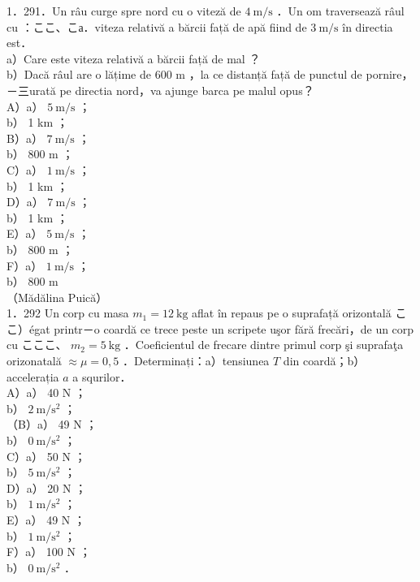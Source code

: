 {1．291．Un râu curge spre nord cu o viteză de $4 \mathrm{~m} / \mathrm{s}$ ．Un om traversează râul cu ：ここ、こа．viteza relativă a bărcii față de apă fiind de $3 \mathrm{~m} / \mathrm{s}$ în directia est．\\
a）Care este viteza relativă a bărcii față de mal ？\\
b）Dacă râul are o lățime de 600 m ，la ce distanță față de punctul de pornire， －三urată pe directia nord，va ajunge barca pe malul opus？\\
A）a） $5 \mathrm{~m} / \mathrm{s}$ ；\\
b） 1 km ；\\
B）a） $7 \mathrm{~m} / \mathrm{s}$ ；\\
b） 800 m ；\\
C）a） $1 \mathrm{~m} / \mathrm{s}$ ；\\
b） 1 km ；\\
D）a） $7 \mathrm{~m} / \mathrm{s}$ ；\\
b） 1 km ；\\
E）a） $5 \mathrm{~m} / \mathrm{s}$ ；\\
b） 800 m ；\\
F）a） $1 \mathrm{~m} / \mathrm{s}$ ；\\
b） 800 m\\
（Mădălina Puică）\\
1．292 Un corp cu masa $m_{1}=12 \mathrm{~kg}$ aflat în repaus pe o suprafață orizontală ここ）égat printr－o coardă ce trece peste un scripete uşor fără frecări，de un corp cu こここ、 $m_{2}=5 \mathrm{~kg}$ ．Coeficientul de frecare dintre primul corp şi suprafaţa orizonatală $\approx \mu=0,5$ ．Determinați：a）tensiunea $T$ din coardă；b）accelerația $a$ a squrilor．\\
A）a） 40 N ；\\
b） $2 \mathrm{~m} / \mathrm{s}^{2}$ ；\\
（B）a） 49 N ；\\
b） $0 \mathrm{~m} / \mathrm{s}^{2}$ ；\\
C）a） 50 N ；\\
b） $5 \mathrm{~m} / \mathrm{s}^{2}$ ；\\
D）a） 20 N ；\\
b） $1 \mathrm{~m} / \mathrm{s}^{2}$ ；\\
E）a） 49 N ；\\
b） $1 \mathrm{~m} / \mathrm{s}^{2}$ ；\\
F）a） 100 N ；\\
b） $0 \mathrm{~m} / \mathrm{s}^{2}$ ．\\
}
